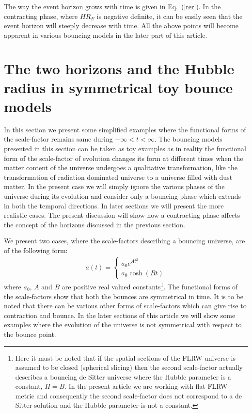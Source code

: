 \documentclass[24pt]{article}
\begin{document}
The way the event horizon grows with time is given in Eq.~(\ref{rer}).
In the contracting phase, where $H R_E$ is negative definite, it can
be easily seen that the event horizon will steeply decrease with time.
All the above points will become apparent in various bouncing models
in the later part of this article.
\section{The two horizons and the Hubble radius in symmetrical toy
  bounce models}
\label{tbm}

In this section we present some simplified examples where the
functional forms of the scale-factor remains same during $-\infty < t
< \infty$. The bouncing models presented in this section can be
taken as toy examples as in reality the functional form of the
scale-factor of evolution changes its form at different times when the
matter content of the universe undergoes a qualitative transformation,
like the transformation of radiation dominated universe to a universe
filled with dust matter. In the present case we will simply ignore the
various phases of the universe during its evolution and consider only
a bouncing phase which extends in both the temporal directions. In
later sections we will present the more realistic cases. The present
discussion will show how a contracting phase affects the concept of
the horizons discussed in the previous section.

We present two cases, where the scale-factors describing a bouncing
universe, are of the following form:
\begin{eqnarray}
a(t)=\left\{
\begin{array}{ll}
a_0 e^{A t^2}\\
a_0 \cosh (Bt)
\end{array}
\right.
\label{bsfs}
\end{eqnarray}
where $a_0$, $A$ and $B$ are positive real valued
constants\footnote{Here it must be noted that if the spatial sections
  of the FLRW universe is assumed to be closed (spherical slicing)
  then the second scale-factor actually describes a bouncing de Sitter
  universe where the Hubble parameter is a constant, 
  $H=B$. In the present article we are working with flat FLRW metric
  and consequently the second scale-factor does not correspond to a de
  Sitter solution and the Hubble parameter is not a constant.}. The
functional forms of the scale-factors show that both the bounces are
symmetrical in time.  It is to be noted that there can be various
other forms of scale-factors which can give rise to contraction and
bounce. In the later sections of this article we will show some
examples where the evolution of the universe is not symmetrical with
respect to the bounce point.
\end{document}
